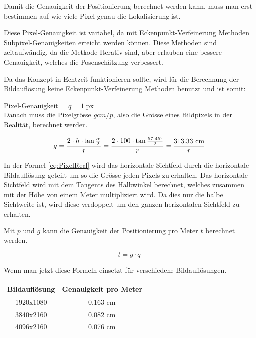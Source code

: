 Damit die Genauigkeit der Positionierung berechnet werden kann, muss man erst bestimmen auf wie viele Pixel genau die Lokalisierung ist.

Diese Pixel-Genauigkeit ist variabel, da mit Eckenpunkt-Verfeinerung Methoden Subpixel-Genauigkeiten erreicht werden können.
Diese Methoden sind zeitaufwändig, da die Methode Iterativ sind, aber erlauben eine bessere Genauigkeit, welches die Posenschätzung verbessert.

Da das Konzept in Echtzeit funktionieren sollte, wird für die Berechnung der Bildauflösung keine Eckenpunkt-Verfeinerung Methoden benutzt und ist somit:

Pixel-Genauigkeit = \(q = 1\text{ px}\)\\

Danach muss die Pixelgrösse \(g cm/p\), also die Grösse eines Bildpixels in der Realität, berechnet werden.

\begin{equation}
g = \frac{2 \cdot h \cdot \tan\frac{\alpha}{2}}{r} = \frac{2 \cdot 100 \cdot \tan\frac{57.45\degree}{2}}{r} = \frac{313.33\text{ cm}}{r}
\label{eq:PixelReal}
\end{equation}

In der Formel \ref{eq:PixelReal} wird das horizontale Sichtfeld durch die horizontale Bildauflösung geteilt um so die Grösse jeden Pixels zu erhalten.
Das horizontale Sichtfeld wird mit dem Tangents des Halbwinkel berechnet, welches zusammen mit der Höhe von einem Meter multipliziert wird.
Da dies nur die halbe Sichtweite ist, wird diese verdoppelt um den ganzen horizontalen Sichtfeld zu erhalten.

Mit \(p\) und \(g\) kann die Genauigkeit der Positionierung pro Meter \(t\)  berechnet werden.

\begin{equation}
t = g \cdot q
\label{eq:precision}
\end{equation}

Wenn man jetzt diese Formeln einsetzt für verschiedene Bildauflösungen.

\begin{center}
    \begin{tabular}{ c c}
    \label{tab:resolutions}
     Bildauflösung & Genauigkeit pro Meter\\ 
     \hline
     1920x1080 & 0.163 cm \\  
     3840x2160 & 0.082 cm \\
     4096x2160 & 0.076 cm \\ 
\end{tabular}
\end{center}

